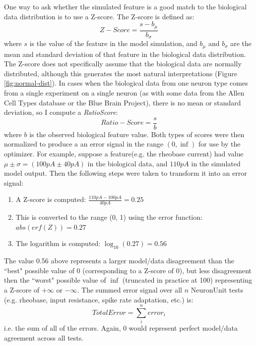 One way to ask whether the simulated feature is a good match to the biological data distribution is to use a Z-score.
The Z-score is defined as:
\begin{equation}
Z-Score = \frac{s - b_{\mu}}{b_{\sigma}}
\end{equation}
where $s$ is the value of the feature in the model simulation, and $b_{\mu}$ and $b_{\sigma}$ are the mean and standard deviation of that feature in the biological data distribution.
The Z-score does not specifically assume that the biological data are normally distributed, although this generates the most natural interpretations (Figure \ref{fig:normal-dist}).
In cases when the biological data from one neuron type comes from a single experiment on a single neuron (as with some data from the Allen Cell Types database or the Blue Brain Project), there is no mean or standard deviation, so I compute a \emph{RatioScore}:
\begin{equation}
Ratio-Score = \frac{s}{b}
\end{equation}
where $b$ is the observed biological feature value.
Both types of scores were then normalized to produce a an error signal in the range $(0, \inf)$ for use by the optimizer.
For example, suppose a feature(e.g. the rheobase current) had value $\mu \pm \sigma = (100pA \pm 40pA)$ in the biological data, and $110 pA$ in the simulated model output.
Then the following steps were taken to transform it into an error signal:
\begin{enumerate}
 \item A Z-score is computed: $\frac{110 pA - 100 pA}{40 pA} = 0.25$
 \item This is converted to the range (0, 1) using the error function: $abs(erf(Z)) = 0.27$ 
 \item The logarithm is computed: $\log_{10}(0.27) = 0.56$ 
\end{enumerate}
The value 0.56 above represents a larger model/data disagreement than the ``best" possible value of 0 (corresponding to a Z-score of 0), but less disagreement then the ``worst" possible value of $\inf$ (truncated in practice at 100) representing a Z-score of $+\infty$ or $-\infty$. The summed error signal over all $n$ NeuronUnit tests (e.g. rheobase, input resistance, spike rate adaptation, etc.) is:
\begin{equation}
Total  Error = \sum_i^n error_i
\end{equation}
i.e. the sum of all of the errors.  Again, 0 would represent perfect model/data agreement across all tests.

